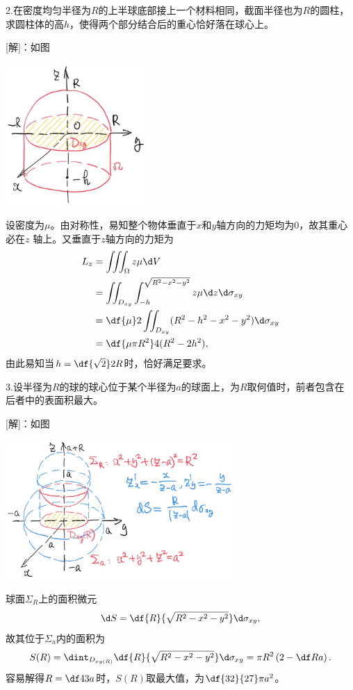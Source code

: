 \bs

2.在密度均匀半径为$R$的上半球底部接上一个材料相同，截面半径也为$R$的圆柱，
求圆柱体的高$h$，使得两个部分结合后的重心恰好落在球心上。

[解]：如图
\begin{center}
	\includegraphics[width=0.4\textwidth]{./images/ch10/10.4.2.jpg}
\end{center}
设密度为$\mu$。由对称性，易知整个物体垂直于$x$和$y$轴方向的力矩均为$0$，故其重心必在$z$
轴上。又垂直于$z$轴方向的力矩为
\begin{align*}
	L_z
	&=\iiint_{\Omega}z\mu\d V\\
	&=\iint_{D_{xy}}\int_{-h}^{\sqrt{R^2-x^2-y^2}}z\mu\d z\d\sigma_{xy}\\
	&=\df{\mu}2\iint_{D_{xy}}(R^2-h^2-x^2-y^2)\d\sigma_{xy}\\
	&=\df{\mu\pi R^2}4(R^2-2h^2),
\end{align*}
由此易知当$h=\df{\sqrt2}2R$时，恰好满足要求。\fin

\bs

3.设半径为$R$的球的球心位于某个半径为$a$的球面上，为$R$取何值时，前者包含在
后者中的表面积最大。

[解]：如图
\begin{center}
	\includegraphics[width=0.65\textwidth]{./images/ch10/10.4.3.jpg}
\end{center}
球面$\Sigma_R$上的面积微元
$$\d S=\df{R}{\sqrt{R^2-x^2-y^2}}\d\sigma_{xy},$$
故其位于$\Sigma_a$内的面积为
$$S(R)=\dint_{D_{xy(R)}}\df{R}{\sqrt{R^2-x^2-y^2}}\d\sigma_{xy}
=\pi R^2\left(2-\df Ra\right).$$
容易解得$R=\df43a$时，$S(R)$取最大值，为$\df{32}{27}\pi a^2$。\fin

